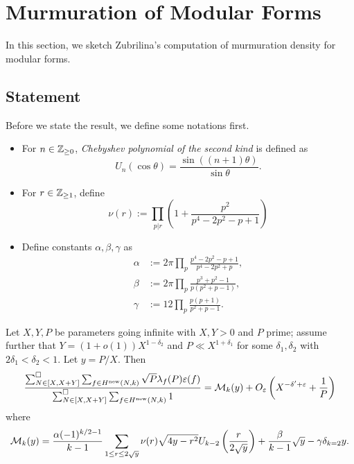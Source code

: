 \section{Murmuration of Modular Forms}
\label{sec:modform}

In this section, we sketch Zubrilina's computation of murmuration density for modular forms.

\subsection{Statement}

Before we state the result, we define some notations first.
\begin{itemize}
    \item For $n \in \mathbb{Z}_{\ge 0}$, \emph{Chebyshev polynomial of the second kind} is defined as
    \[
        U_n(\cos \theta) = \frac{\sin((n+1) \theta)}{\sin\theta}. 
    \]
    \item For $r \in \mathbb{Z}_{\ge 1}$, define
    \[
        \nu(r) := \prod_{p | r} \left(1 + \frac{p^2}{p^4 - 2p^2 - p + 1}\right)
    \]
    \item Define constants $\alpha, \beta, \gamma$ as
    \begin{align*}
        \alpha &:= 2\pi \prod_{p} \frac{p^4 - 2p^2 - p + 1}{p^4 - 2p^2 + p}, \\
        \beta &:= 2\pi \prod_{p} \frac{p^3 + p^2 - 1}{p(p^2 + p - 1)}, \\
        \gamma &:= 12 \prod_{p} \frac{p(p + 1)}{p^2 + p - 1}.
    \end{align*}
\end{itemize}
\begin{theorem}
    \label{thm:zubrilina_modform}
    Let $X, Y, P$ be parameters going infinite with $X, Y > 0$ and $P$ prime; assume further that $Y = (1 + o(1))X^{1 - \delta_2}$ and $P \ll X^{1 + \delta_1}$ for some $\delta_1, \delta_2$ with $2\delta_1 < \delta_2 < 1$.
    Let $y = P/X$. Then
    \begin{equation}
        \label{eqn:zubrilina_modform}
        \frac{\sum_{N \in [X, X + Y]}^\square \sum_{f \in H^{\mathrm{new}}(N, k)} \sqrt{P} \lambda_f(P) \varepsilon(f)}{\sum_{N \in  [X, X + Y]}^\square \sum_{f \in H^{\mathrm{new}}(N, k)} 1} = \mathcal{M}_k(y) + O_\varepsilon \left(X^{-\delta' + \varepsilon} + \frac{1}{P}\right)
    \end{equation}
    where
    \begin{equation}
        \mathcal{M}_k(y) = \frac{\alpha(-1)^{k/2 - 1}}{k - 1} \sum_{1 \le r \le 2\sqrt{y}} \nu(r) \sqrt{4y - r^2} U_{k - 2} \left(\frac{r}{2\sqrt{y}}\right) + \frac{\beta}{k-1} \sqrt{y} - \gamma \delta_{k=2} y.
    \end{equation}
\end{theorem}

